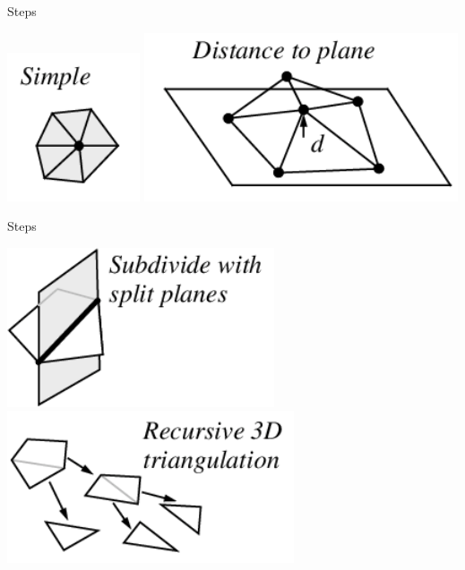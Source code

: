 \begin{frame}{Steps}
    \begin{center}
   
           \includegraphics[scale=1.25]{images/simple.png}  
            \includegraphics[scale=1.11]{images/distance.png}

    \end{center}

\end{frame}


\begin{frame}{Steps}
    \begin{center}
   
           \includegraphics[scale=1.1]{images/split.png}  
            \includegraphics[scale=1.14]{images/recursion.png}

    \end{center}

\end{frame}
